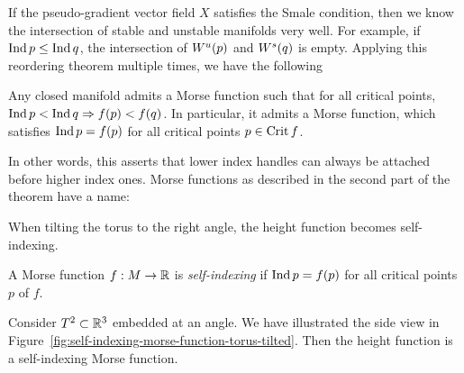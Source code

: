 If the pseudo-gradient vector field $X$ satisfies the Smale condition, then we know the intersection of stable and unstable manifolds very well.
For example, if $\operatorname{Ind} p \le  \operatorname{Ind} q$, the intersection of $W^u(p)$ and  $W^s(q)$ is empty.
Applying this reordering theorem multiple times, we have the following

\begin{theorem}
    Any closed manifold admits a Morse function such that for all critical points, $\operatorname{Ind} p < \operatorname{Ind} q \Rightarrow f(p) < f(q)$.
    In particular, it admits a Morse function, which satisfies $ \operatorname{Ind} p  = f(p) $ for all critical points $p \in \operatorname{Crit} f$.
\end{theorem}
In other words, this asserts that lower index handles can always be attached before higher index ones.
Morse functions as described in the second part of the theorem have a name:
\begin{marginfigure}
    \centering
    \caption{When tilting the torus to the right angle, the height function becomes self-indexing.}
    \label{fig:self-indexing-morse-function-torus-tilted}
\end{marginfigure}
\begin{definition}
    A Morse function $f: M \to  \mathbb{R}$ is \emph{self-indexing} if $\operatorname{Ind} p = f(p)$ for all critical points  $p$ of  $f$.
\end{definition}
\begin{eg}
    Consider $T^2 \subset \mathbb{R}^3$ embedded at an angle. We have illustrated the side view in Figure~\ref{fig:self-indexing-morse-function-torus-tilted}.
    Then the height function is a self-indexing Morse function.
\end{eg}


